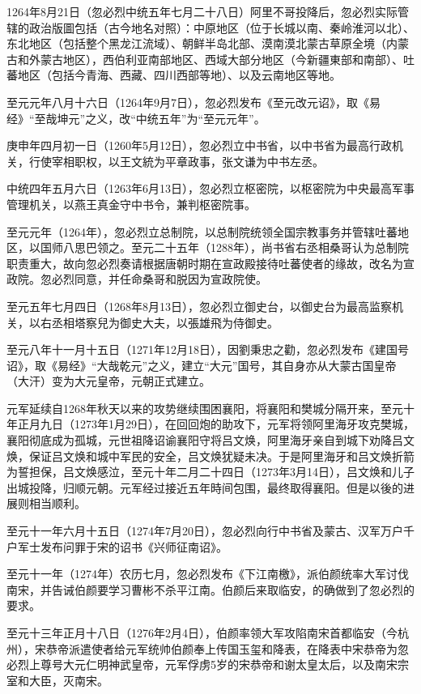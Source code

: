 1264年8月21日（忽必烈中统五年七月二十八日）阿里不哥投降后，忽必烈实际管辖的政治版圖包括（古今地名对照）：中原地区（位于长城以南、秦岭淮河以北）、东北地区（包括整个黑龙江流域）、朝鲜半岛北部、漠南漠北蒙古草原全境（内蒙古和外蒙古地区），西伯利亚南部地区、西域大部分地区（今新疆東部和南部）、吐蕃地区（包括今青海、西藏、四川西部等地）、以及云南地区等地。

至元元年八月十六日（1264年9月7日），忽必烈发布《至元改元诏》，取《易经》“至哉坤元”之义，改“中统五年”为“至元元年”。

庚申年四月初一日（1260年5月12日），忽必烈立中书省，以中书省为最高行政机关，行使宰相职权，以王文統为平章政事，张文谦为中书左丞。

中统四年五月六日（1263年6月13日），忽必烈立枢密院，以枢密院为中央最高军事管理机关，以燕王真金守中书令，兼判枢密院事。

至元元年（1264年），忽必烈立总制院，以总制院统领全国宗教事务并管辖吐蕃地区，以国师八思巴领之。至元二十五年（1288年），尚书省右丞相桑哥认为总制院职责重大，故向忽必烈奏请根据唐朝时期在宣政殿接待吐蕃使者的缘故，改名为宣政院。忽必烈同意，并任命桑哥和脱因为宣政院使。

至元五年七月四日（1268年8月13日），忽必烈立御史台，以御史台为最高监察机关，以右丞相塔察兒为御史大夫，以張雄飛为侍御史。

至元八年十一月十五日（1271年12月18日），因劉秉忠之勸，忽必烈发布《建国号诏》，取《易经》“大哉乾元”之义，建立“大元”国号，其自身亦从大蒙古国皇帝（大汗）变为大元皇帝，元朝正式建立。

元军延续自1268年秋天以来的攻势继续围困襄阳，将襄阳和樊城分隔开来，至元十年正月九日（1273年1月29日），在回回炮的助攻下，元军将领阿里海牙攻克樊城，襄阳彻底成为孤城，元世祖降诏谕襄阳守将吕文焕，阿里海牙亲自到城下劝降吕文焕，保证吕文焕和城中军民的安全，吕文焕犹疑未决。于是阿里海牙和吕文焕折箭为誓担保，吕文焕感泣，至元十年二月二十四日（1273年3月14日），吕文焕和儿子出城投降，归顺元朝。元军经过接近五年時间包围，最终取得襄阳。但是以後的进展则相当顺利。

至元十一年六月十五日（1274年7月20日），忽必烈向行中书省及蒙古、汉军万户千户军士发布问罪于宋的诏书《兴师征南诏》。

至元十一年（1274年）农历七月，忽必烈发布《下江南檄》，派伯颜统率大军讨伐南宋，并告诫伯颜要学习曹彬不杀平江南。伯颜后来取临安，的确做到了忽必烈的要求。

至元十三年正月十八日（1276年2月4日），伯颜率领大军攻陷南宋首都临安（今杭州），宋恭帝派遣使者给元军统帅伯颜奉上传国玉玺和降表，在降表中宋恭帝为忽必烈上尊号大元仁明神武皇帝，元军俘虏5岁的宋恭帝和谢太皇太后，以及南宋宗室和大臣，灭南宋。

